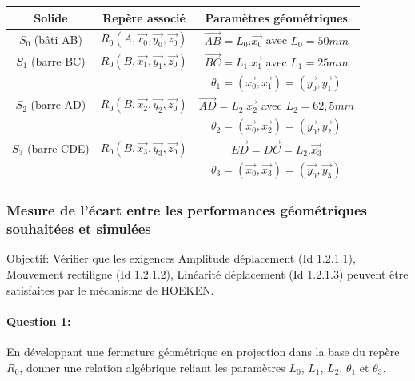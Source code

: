 \begin{center}
\begin{tabular}{|c|c|c|}
\hline
Solide & Repère associé	& Paramètres géométriques \\
\hline
$S_0$ (bâti AB)	& $R_0(A,\overrightarrow{x_0},\overrightarrow{y_0},\overrightarrow{z_0})$ & $\overrightarrow{AB}=L_0.\overrightarrow{x_0}$ avec $L_0 = 50mm$ \\
\hline
$S_1$ (barre BC) & $R_0(B,\overrightarrow{x_1},\overrightarrow{y_1},\overrightarrow{z_0})$ & $\overrightarrow{BC}=L_1.\overrightarrow{x_1}$  avec $L_1 = 25mm$ \\
 & & $\theta_1=(\overrightarrow{x_0},\overrightarrow{x_1})=(\overrightarrow{y_0},\overrightarrow{y_1})$ \\
$S_2$  (barre AD) & $R_0(B,\overrightarrow{x_2},\overrightarrow{y_2},\overrightarrow{z_0})$	& $\overrightarrow{AD}=L_2.\overrightarrow{x_2}$ avec $L_2 = 62,5 mm$ \\
 & & $\theta_2=(\overrightarrow{x_0},\overrightarrow{x_2})=(\overrightarrow{y_0},\overrightarrow{y_2})$ \\
\hline
$S_3$ (barre CDE) & $R_0(B,\overrightarrow{x_3},\overrightarrow{y_3},\overrightarrow{z_0})$ & $\overrightarrow{ED}=\overrightarrow{DC}=L_2.\overrightarrow{x_3}$ \\
 & & $\theta_3=(\overrightarrow{x_0},\overrightarrow{x_3})=(\overrightarrow{y_0},\overrightarrow{y_3})$ \\
\hline
\end{tabular}
\end{center}

\subsubsection{Mesure de l'écart entre les performances géométriques souhaitées et simulées}

Objectif: Vérifier que les exigences \og Amplitude déplacement \fg (Id 1.2.1.1), \og Mouvement rectiligne \fg (Id 1.2.1.2), \og Linéarité déplacement \fg (Id 1.2.1.3) peuvent être satisfaites par le mécanisme de HOEKEN.

\paragraph{Question 1:} En développant une fermeture géométrique en projection dans la base du repère $R_0$, donner une relation algébrique reliant les paramètres $L_0$, $L_1$, $L_2$, $\theta_1$  et $\theta_3$.

